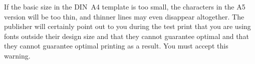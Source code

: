 If the basic size in the DIN~A4 template is too small, the characters in the A5
version will be too thin, and thinner lines may even disappear altogether.
The publisher will certainly point out to you during the test print that you
are using fonts outside their design size and that they cannot guarantee
optimal and that they cannot guarantee optimal printing as a result. You must
accept this warning.

